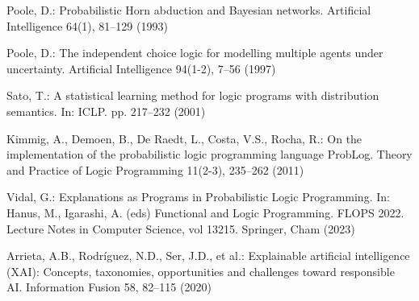 \begin{singlespace}
\begin{thebibliography}{}
 Poole, D.: Probabilistic Horn abduction and Bayesian networks. Artificial Intelligence 64(1), 81--129 (1993)

 Poole, D.: The independent choice logic for modelling multiple agents under uncertainty. Artificial Intelligence 94(1-2), 7--56 (1997)

 Sato, T.: A statistical learning method for logic programs with distribution semantics. In: ICLP. pp. 217--232 (2001)

 Kimmig, A., Demoen, B., De Raedt, L., Costa, V.S., Rocha, R.: On the implementation of the probabilistic logic programming language ProbLog. Theory and Practice of Logic Programming 11(2-3), 235--262 (2011)

 Vidal, G.: Explanations as Programs in Probabilistic Logic Programming. In: Hanus, M., Igarashi, A. (eds) Functional and Logic Programming. FLOPS 2022. Lecture Notes in Computer Science, vol 13215. Springer, Cham (2023)

 Arrieta, A.B., Rodríguez, N.D., Ser, J.D., et al.: Explainable artificial intelligence (XAI): Concepts, taxonomies, opportunities and challenges toward responsible AI. Information Fusion 58, 82--115 (2020)

\end{thebibliography}

\end{singlespace}
